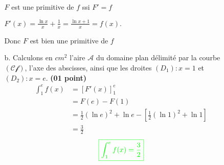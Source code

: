 \documentclass[12pt]{article}
\begin{document}
\begin{enumerate}
\begin{itemize}
$F$ est une primitive de $f$ ssi $F'=f$

$F'(x)=\frac{\ln x}{x}+\frac{1}{x}=\frac{\ln x + 1 }{x}=f(x).$

Donc  $F$ est bien une primitive de $f$
\item[b.] Calculons en $cm^{2}$ l'aire $\mathscr{A}$ du domaine plan délimité par la courbe $(\mathscr{Cf})$, l'axe des abscisses, ainsi que les droites $(D_{1}): x=1$ et $(D_{2}): x=e$. \textbf{(01 point)}
\begin{align*}
\int_{1}^{e}f(x)&=\left[F'(x) \right]_{1}^{e}\\
 								&= F(e)-F(1)\\
 								&= \frac{1}{2}(\ln e)^{2}+\ln e-\left[\frac{1}{2}(\ln 1)^{2}+\ln 1 \right]\\
 								&=\frac{3}{2}
\end{align*}
$$\textcolor{green}{\boxed{\int_{1}^{e}f(x)=\frac{3}{2}}}$$
\end{itemize}
\end{enumerate}
\end{document}
